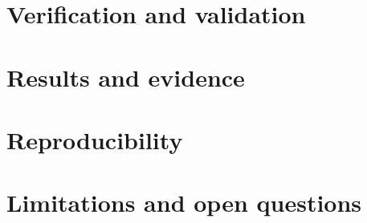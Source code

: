 \documentclass[11pt]{article}
\begin{document}
\section{Verification and validation}\label{sec:verify}

\section{Results and evidence}\label{sec:results}

\section{Reproducibility}\label{sec:repro}

\section{Limitations and open questions}\label{sec:limits}


\end{document}
